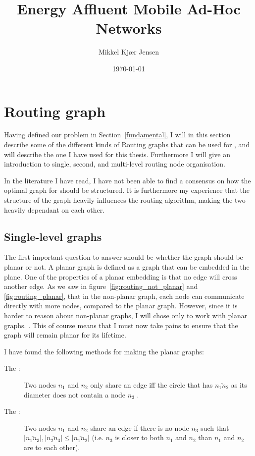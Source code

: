 \documentclass[letter, 12pt, english, draft]{article}
\title{Energy Affluent Mobile Ad-Hoc Networks}
\author{Mikkel Kjær Jensen}
\date{\today}
\begin{document}
\pagestyle{plain}

\section{Routing graph}
Having defined our problem in Section~\ref{fundamental}, I will in this section describe some of the different kinds of Routing graphs that can be used for \manet, and will describe the one I have used for this thesis. Furthermore I will give an introduction to single, second, and multi-level routing node organisation. 

In the literature I have read, I have not been able to find a consensus on how the optimal graph for \manet should be structured. It is furthermore my experience that the structure of the graph heavily influences the routing algorithm, making the two heavily dependant on each other.

\subsection{Single-level graphs}
The first important question to answer should be whether the graph should be planar or not. A planar graph is defined as a graph that can be embedded in the plane. One of the properties of a planar embedding is that no edge will cross another edge. As we saw in figure~\ref{fig:routing_not_planar} and \ref{fig:routing_planar}, that in the non-planar graph, each node can communicate directly with more nodes, compared to the planar graph. However, since it is harder to reason about non-planar graphs, I will chose only to work with planar graphs. . This of course means that I must now take pains to ensure that the graph will remain planar for its lifetime.

I have found the following methods for making the planar graphs:

\begin{description}
\item[The \gabe:] Two nodes $n_1$ and $n_2$ only share an edge iff the circle that has $\overline{n_1n_2}$ as its diameter does not contain a node $n_3$ \cite{gopher}. 
\item[The \rng:] Two nodes $n_1$ and $n_2$ share an edge if there is no node $n_3$ such that $|\overline{n_1n_3}|, |\overline{n_2n_3}| \leq |\overline{n_1n_2}|$ (i.e. $n_3$ is closer to both $n_1$ and $n_2$ than $n_1$ and $n_2$ are to each other).
\end{description}
\end{document}
